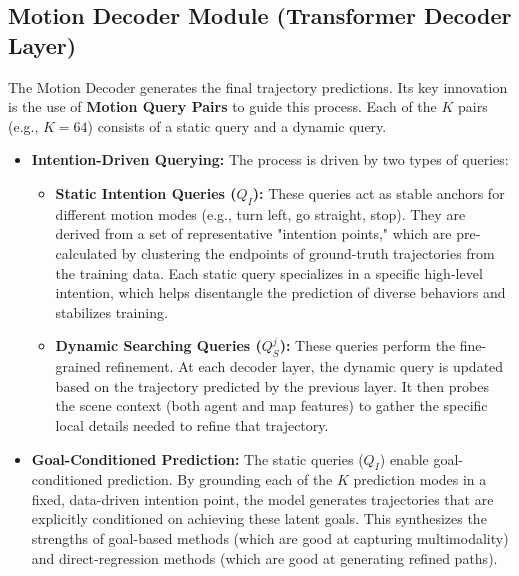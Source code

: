 \subsection{Motion Decoder Module (Transformer Decoder Layer)}
The Motion Decoder generates the final trajectory predictions. Its key innovation is the use of \textbf{Motion Query Pairs} to guide this process. Each of the $K$ pairs (e.g., $K=64$) consists of a static query and a dynamic query.

\begin{itemize}
    \item \textbf{Intention-Driven Querying:} The process is driven by two types of queries:
    \begin{itemize}
        \item \textbf{Static Intention Queries ($Q_I$):} These queries act as stable anchors for different motion modes (e.g., turn left, go straight, stop). They are derived from a set of representative "intention points," which are pre-calculated by clustering the endpoints of ground-truth trajectories from the training data. Each static query specializes in a specific high-level intention, which helps disentangle the prediction of diverse behaviors and stabilizes training.
        \item \textbf{Dynamic Searching Queries ($Q_S^j$):} These queries perform the fine-grained refinement. At each decoder layer, the dynamic query is updated based on the trajectory predicted by the previous layer. It then probes the scene context (both agent and map features) to gather the specific local details needed to refine that trajectory.
    \end{itemize}
    \item \textbf{Goal-Conditioned Prediction:} The static queries ($Q_I$) enable goal-conditioned prediction. By grounding each of the $K$ prediction modes in a fixed, data-driven intention point, the model generates trajectories that are explicitly conditioned on achieving these latent goals. This synthesizes the strengths of goal-based methods (which are good at capturing multimodality) and direct-regression methods (which are good at generating refined paths).
\end{itemize}

